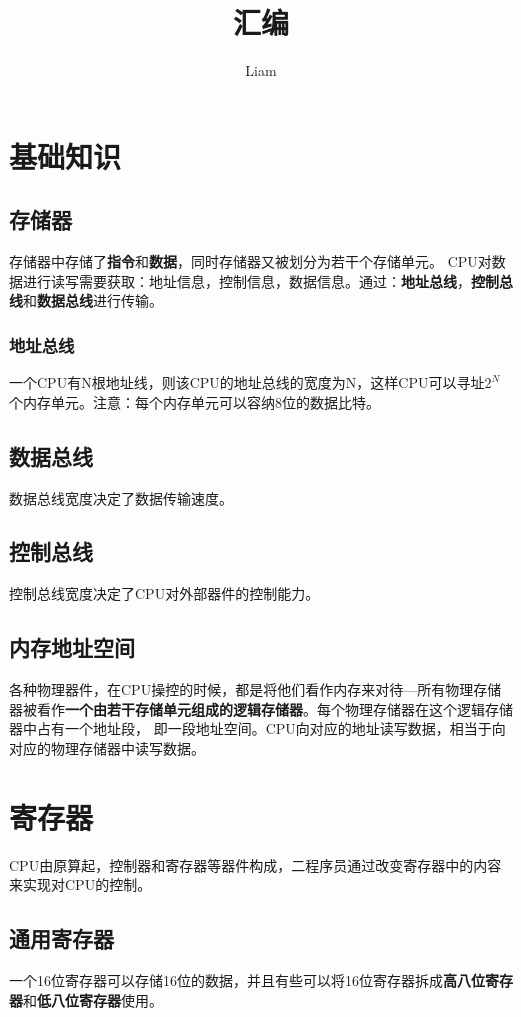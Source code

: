 \documentclass[11pt,a4paper]{ctexart}
\title{汇编}
\author{Liam}
\begin{document}
\maketitle

\section{基础知识}
\subsection{存储器}
存储器中存储了\textbf{指令}和\textbf{数据}，同时存储器又被划分为若干个存储单元。
CPU对数据进行读写需要获取：地址信息，控制信息，数据信息。通过：\textbf{地址总线}，\textbf{控制总线}和\textbf{数据总线}进行传输。

\subsubsection{地址总线}
一个CPU有N根地址线，则该CPU的地址总线的宽度为N，这样CPU可以寻址$2^N$个内存单元。注意：每个内存单元可以容纳8位的数据比特。

\subsection{数据总线}
数据总线宽度决定了数据传输速度。

\subsection{控制总线}
控制总线宽度决定了CPU对外部器件的控制能力。

\subsection{内存地址空间}
各种物理器件，在CPU操控的时候，都是将他们看作内存来对待---所有物理存储器被看作\textbf{一个由若干存储单元组成的逻辑存储器}。每个物理存储器在这个逻辑存储器中占有一个地址段，
即一段地址空间。CPU向对应的地址读写数据，相当于向对应的物理存储器中读写数据。

\section{寄存器}
CPU由原算起，控制器和寄存器等器件构成，二程序员通过改变寄存器中的内容来实现对CPU的控制。
\subsection{通用寄存器}
一个16位寄存器可以存储16位的数据，并且有些可以将16位寄存器拆成\textbf{高八位寄存器}和\textbf{低八位寄存器}使用。
\end{document}
